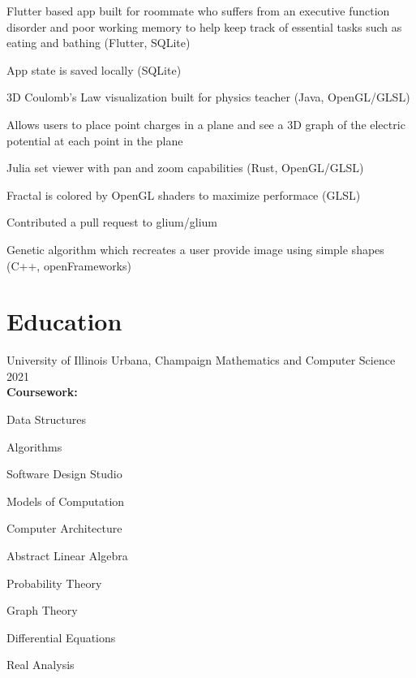 \documentclass[hidelinks]{scrartcl}
\begin{document}
{
    \item Flutter based app built for roommate who suffers from an executive 
        function disorder and poor working memory to help keep track of essential 
        tasks such as eating and bathing (Flutter, SQLite)
    \item App state is saved locally (SQLite)
}
%
{
    \item 3D Coulomb's Law visualization built for physics teacher (Java, OpenGL/GLSL)
    \item Allows users to place point charges in a plane and see a 3D graph of the electric potential at each point in the plane}

{
    \item Julia set viewer with pan and zoom capabilities (Rust, OpenGL/GLSL)
    \item Fractal is colored by OpenGL shaders to maximize performace (GLSL)
    \item Contributed a pull request to glium/glium
}

{
    \item Genetic algorithm which recreates a user provide image using simple 
        shapes (C++, openFrameworks)
}



\section{Education}
\school
{University of Illinois}
{Urbana, Champaign}
{Mathematics and Computer Science}
{2021}
\\
\textbf{Coursework:} 
\begin{citemize*}
    \item[] Data Structures 
    \item Algorithms 
    \item Software Design Studio 
    \item Models of Computation 
    \item Computer Architecture
    \item Abstract Linear Algebra 
    \item Probability Theory 
    \item Graph Theory 
    \item Differential Equations
    \item Real Analysis 
\end{citemize*}
\end{document}
